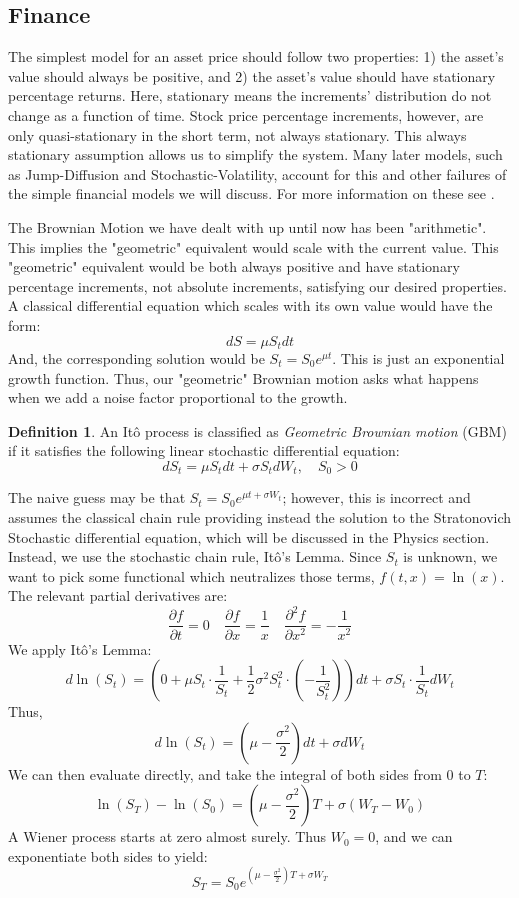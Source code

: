 \documentclass[12pt]{article}
\theoremstyle{definition}
\newtheorem{definition}{Definition}[section]
\theoremstyle{plain}
\theoremstyle{remark}
\begin{document}
\subsection{Finance}

The simplest model for an asset price should follow two properties: 1) the asset's value should always be positive, and 2) the asset's value should have stationary percentage returns.  Here, stationary means the increments' distribution do not change as a function of time.  Stock price percentage increments, however, are only quasi-stationary in the short term, not always stationary.  This always stationary assumption allows us to simplify the system.  Many later models, such as Jump-Diffusion and Stochastic-Volatility, account for this and other failures of the simple financial models we will discuss.  For more information on these see \cite{JumpDiff,StoVal}.

The Brownian Motion we have dealt with up until now has been "arithmetic".  This implies the "geometric" equivalent would scale with the current value.  This "geometric" equivalent would be both always positive and have stationary percentage increments, not absolute increments, satisfying our desired properties.  A classical differential equation which scales with its own value would have the form:
\[
dS = \mu S_tdt
\]
And, the corresponding solution would be $S_t = S_0 e^{\mu t}$.  This is just an exponential growth function.  Thus, our "geometric" Brownian motion asks what happens when we add a noise factor proportional to the growth.

\begin{definition}
An It\^o process is classified as \textit{Geometric Brownian motion} (GBM) if it satisfies the following linear stochastic differential equation:
\[
dS_t = \mu S_t dt + \sigma S_t dW_t, \quad S_0 > 0
\]
\end{definition}

The naive guess may be that $S_t = S_0 e^{\mu t + \sigma W_t}$; however, this is incorrect and assumes the classical chain rule providing instead the solution to the Stratonovich Stochastic differential equation, which will be discussed in the Physics section.  Instead, we use the stochastic chain rule, It\^o's Lemma.  Since $S_t$ is unknown, we want to pick some functional which neutralizes those terms, $f(t,x) = \ln(x)$.  The relevant partial derivatives are:
\[
\frac{\partial f}{\partial t} = 0 \quad \frac{\partial f}{\partial x} = \frac{1}{x} \quad \frac{\partial^2 f}{\partial x^2} = -\frac{1}{x^2}
\]
We apply It\^o's Lemma:
\[
d\ln(S_t) = \left( 0+\mu S_t \cdot \frac{1}{S_t} + \frac{1}{2}\sigma^2S_t^2\cdot  \left(- \frac{1}{S_t^2} \right) \right)dt + \sigma S_t \cdot \frac{1}{S_t}dW_t
\]
Thus,
\[
d\ln(S_t) = \left( \mu- \frac{\sigma^2}{2} \right)dt + \sigma dW_t
\]
We can then evaluate directly, and take the integral of both sides from $0$ to $T$:
\[
\ln(S_T) - \ln(S_0) = \left( \mu- \frac{\sigma^2}{2}\right)T + \sigma (W_T - W_0)
\]
A Wiener process starts at zero almost surely.  Thus $W_0 = 0$, and we can exponentiate both sides to yield:
\[
S_T = S_0 e^{\left( \mu- \frac{\sigma^2}{2}\right)T + \sigma W_T}
\]
\end{document}
